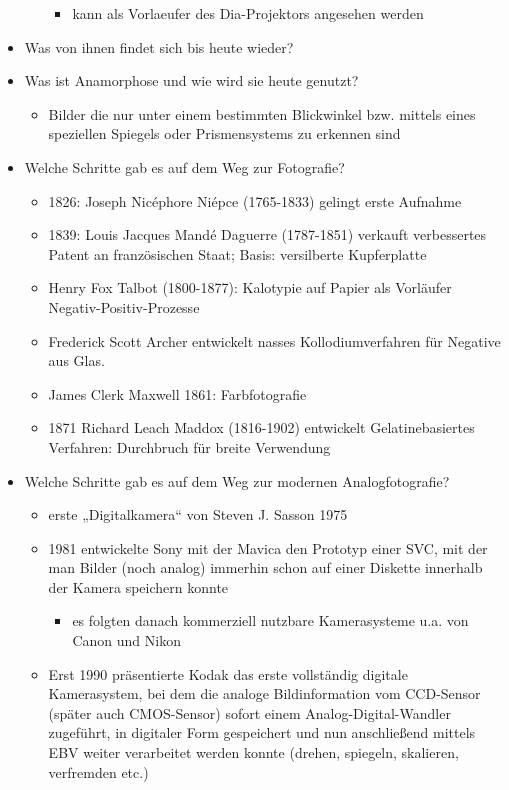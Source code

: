 \documentclass[11pt]{article}
\begin{document}
\begin{itemize}
\begin{itemize}
\begin{itemize}
\item kann als Vorlaeufer des Dia-Projektors angesehen werden
\end{itemize}
\end{itemize}
\item Was von ihnen findet sich bis heute wieder?
\item Was ist Anamorphose und wie wird sie heute genutzt?
\begin{itemize}
\item Bilder die nur unter einem bestimmten Blickwinkel bzw. mittels eines speziellen Spiegels oder Prismensystems zu erkennen sind
\end{itemize}
\item Welche Schritte gab es auf dem Weg zur Fotografie?
\begin{itemize}
\item 1826: Joseph Nicéphore Niépce (1765-1833) gelingt erste Aufnahme
\item 1839: Louis Jacques Mandé Daguerre (1787-1851) verkauft verbessertes Patent an französischen Staat; Basis: versilberte Kupferplatte
\item Henry Fox Talbot (1800-1877): Kalotypie auf Papier als Vorläufer Negativ-Positiv-Prozesse
\item Frederick Scott Archer entwickelt nasses Kollodiumverfahren für Negative aus Glas.
\item James Clerk Maxwell 1861: Farbfotografie
\item 1871 Richard Leach Maddox (1816-1902) entwickelt Gelatinebasiertes Verfahren: Durchbruch für breite Verwendung
\end{itemize}
\item Welche Schritte gab es auf dem Weg zur modernen Analogfotografie?
\begin{itemize}
\item erste „Digitalkamera“ von Steven J. Sasson 1975
\item 1981 entwickelte Sony mit der Mavica den Prototyp einer SVC, mit der man Bilder (noch analog) immerhin schon auf einer Diskette innerhalb der Kamera speichern konnte
\begin{itemize}
\item es folgten danach kommerziell nutzbare Kamerasysteme u.a. von Canon und Nikon
\end{itemize}
\item Erst 1990 präsentierte Kodak das erste vollständig digitale Kamerasystem, bei dem die analoge Bildinformation vom CCD-Sensor (später auch CMOS-Sensor) sofort einem Analog-Digital-Wandler zugeführt, in digitaler Form gespeichert und nun anschließend mittels EBV weiter verarbeitet werden konnte (drehen, spiegeln, skalieren, verfremden etc.)

\end{itemize}
\end{itemize}
\end{document}
